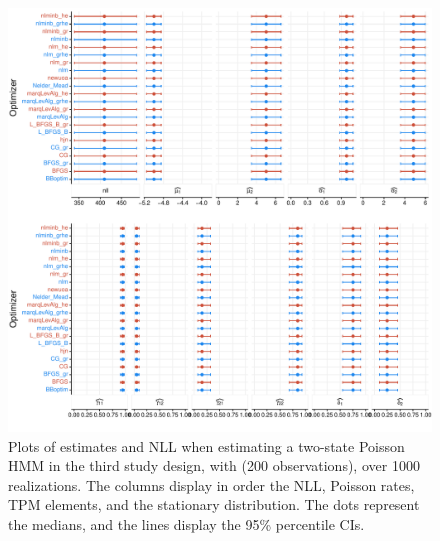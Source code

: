\documentclass[]{interact}\usepackage[]{graphicx}\usepackage[dvipsnames]{xcolor}
\makeatletter
\def\maxwidth{ %
  \ifdim\Gin@nat@width>\linewidth
    \linewidth
  \else
    \Gin@nat@width
  \fi
}
\newenvironment{knitrout}{}{} %
\theoremstyle{plain}%
\theoremstyle{definition}
\theoremstyle{remark}
\makeatother
\begin{document}
  
\begin{knitrout}
\color{fgcolor}\begin{figure}[htb]

{\centering \includegraphics[width=\maxwidth]{figure/bootstrap-graph-simu3-1} 

}

\caption[Plots of estimates and NLL when estimating a two-state Poisson HMM in the third study design, with (200 observations), over 1000 realizations]{Plots of estimates and NLL when estimating a two-state Poisson HMM in the third study design, with (200 observations), over 1000 realizations. The columns display in order the NLL, Poisson rates, TPM elements, and the stationary distribution. The dots represent the medians, and the lines display the 95\% percentile CIs.}\label{fig:bootstrap-graph-simu3}
\end{figure}

\end{knitrout}


\restoregeometry

\clearpage


\end{document}
